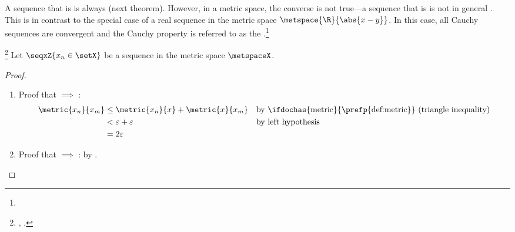 A sequence that is  is always  (next theorem).
However, in a metric space, the converse is not true---a sequence that is  is not in general .
This is in contrast to the special case of a real sequence in the metric space $\metspace{\R}{\abs{x-y}}$. %
In this case, all Cauchy sequences are convergent and the Cauchy property is referred to as the 
.\footnote{
  }
\begin{theorem}
\label{thm:convergent==>cauchy}
\footnote{
  ,
  ,
  }
Let $\seqxZ{x_n\in\setX}$ be a sequence in the metric space $\metspaceX$.
\end{theorem}
\begin{proof}
\begin{enumerate}
  \item Proof that  $\implies$ :
    \begin{align*}
      \metric{x_n}{x_m}
        &\le \metric{x_n}{x} + \metric{x}{x_m}
        &&   \text{by \ifdochas{metric}{\prefp{def:metric}} (triangle inequality)}
      \\&<   \varepsilon + \varepsilon
        &&   \text{by left hypothesis}
      \\&=   2\varepsilon
    \end{align*}

  \item Proof that  $\implies$ : by .

\end{enumerate}
\end{proof}

